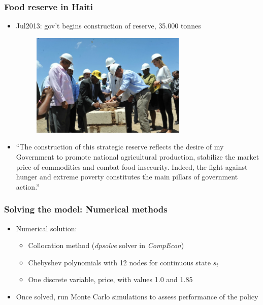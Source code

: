 \documentclass[svgnames]{beamer}
\begin{document}
\begin{frame}
\frametitle{Food reserve in Haiti}
\begin{itemize}
\item<1-> Jul2013: gov't begins construction of reserve, 35.000 tonnes
\vspace{1em}
\begin{figure}
\includegraphics[width=0.7\textwidth]{Haiti_building_reserve}
\end{figure}
\item<2> “The construction of this strategic reserve reflects the desire of my Government to promote national agricultural production, stabilize the market price of commodities and combat food insecurity. Indeed, the fight against hunger and extreme poverty constitutes the main pillars of government action.”
\end{itemize}
\end{frame}



\begin{frame}
\frametitle{Solving the model: Numerical methods}
\begin{itemize}
\item<1> Numerical solution:
\begin{itemize}
\item Collocation method  (\emph{dpsolve} solver in \emph{CompEcon})
\item Chebyshev polynomials with 12 nodes for continuous state $s_t$
\item One discrete variable, price, with values 1.0 and 1.85
\end{itemize}
\vspace{1.5em}
\item<2> Once solved, run Monte Carlo simulations to assess performance of the policy
\end{itemize}
\end{frame}
\end{document}
